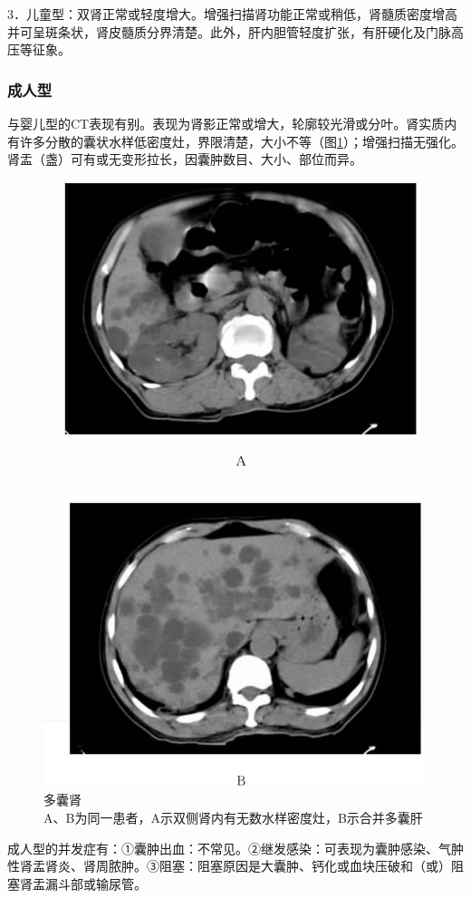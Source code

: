 3．儿童型：双肾正常或轻度增大。增强扫描肾功能正常或稍低，肾髓质密度增高并可呈斑条状，肾皮髓质分界清楚。此外，肝内胆管轻度扩张，有肝硬化及门脉高压等征象。

\subsubsection{成人型}

与婴儿型的CT表现有别。表现为肾影正常或增大，轮廓较光滑或分叶。肾实质内有许多分散的囊状水样低密度灶，界限清楚，大小不等（图\ref{fig15-17}）；增强扫描无强化。肾盂（盏）可有或无变形拉长，因囊肿数目、大小、部位而异。

\begin{figure}[!htbp]
 \centering
 \includegraphics[width=.7\textwidth,height=\textheight,keepaspectratio]{./images/Image00333.jpg}
 \captionsetup{justification=centering}
 \caption{多囊肾\\{\small A、B为同一患者，A示双侧肾内有无数水样密度灶，B示合并多囊肝}}
 \label{fig15-17}
  \end{figure} 

成人型的并发症有：①囊肿出血：不常见。②继发感染：可表现为囊肿感染、气肿性肾盂肾炎、肾周脓肿。③阻塞：阻塞原因是大囊肿、钙化或血块压破和（或）阻塞肾盂漏斗部或输尿管。

